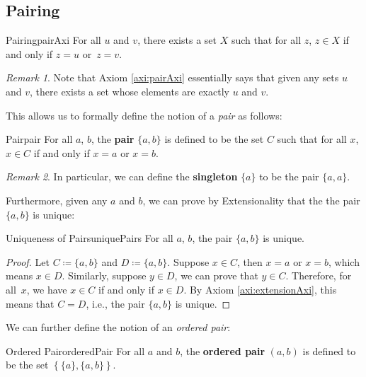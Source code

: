 \documentclass[math]{amznotes}
\theoremstyle{remark}
\newtheorem*{remark}{Remark}
\begin{document}
\subsection{Pairing}
\begin{axibox}{Pairing}{pairAxi}
    For all $u$ and $v$, there exists a set $X$ such that for all $z$, $z \in X$ if and only if $z = u$ or~$z = v$.
\end{axibox}
\begin{notebox}
    \begin{remark}
        Note that Axiom \ref{axi:pairAxi} essentially says that given any sets $u$ and $v$, there exists a set whose elements are exactly $u$ and $v$.
    \end{remark}
\end{notebox}
This allows us to formally define the notion of a \textit{pair} as follows:
\begin{dfnbox}{Pair}{pair}
    For all $a$, $b$, the {\color{red} \textbf{pair}} $\{a, b\}$ is defined to be the set $C$ such that for all $x$, $x \in C$ if and only if $x = a$ or $x = b$.
\end{dfnbox}
\begin{notebox}
    \begin{remark}
        In particular, we can define the {\color{red} \textbf{singleton}} $\{a\}$ to be the pair $\{a, a\}$.
    \end{remark}
\end{notebox}
Furthermore, given any $a$ and $b$, we can prove by Extensionality that the the pair $\{a, b\}$ is unique:
\begin{thmbox}{Uniqueness of Pairs}{uniquePairs}
    For all $a$, $b$, the pair $\{a, b\}$ is unique.
    \tcblower   
    \begin{proof}
        Let $C \coloneqq \{a, b\}$ and $D \coloneqq \{a, b\}$. Suppose $x \in C$, then $x = a$ or $x = b$, which means $x \in D$. Similarly, suppose $y \in D$, we can prove that $y \in C$. Therefore, for all~$x$, we have $x \in C$ if and only if $x \in D$. By Axiom \ref{axi:extensionAxi}, this means that $C = D$, i.e., the pair $\{a, b\}$ is unique.
    \end{proof}
\end{thmbox}
We can further define the notion of an \textit{ordered pair}:
\begin{dfnbox}{Ordered Pair}{orderedPair}
    For all $a$ and $b$, the {\color{red} \textbf{ordered pair}} $(a, b)$ is defined to be the set $\left\{\{a\}, \{a, b\}\right\}$.
\end{dfnbox}
\end{document}
